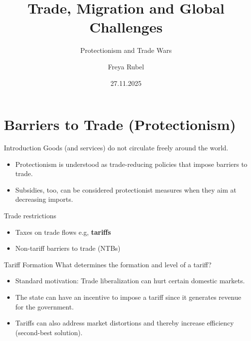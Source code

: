 \documentclass{beamer}
\author{Freya Rubel}
\title{Trade, Migration and Global Challenges}
\subtitle{Protectionism and Trade Wars}
\institute{}
\date{27.11.2025}
\begin{document}
\begin{frame}
    \titlepage
\end{frame}

\begin{frame}
    \tableofcontents[sectionstyle=show, subsectionstyle=show/shaded/hide, subsubsectionstyle=show/shaded/hide]
\end{frame}

\section{Barriers to Trade (Protectionism)}
\begin{frame}{Introduction}
    Goods (and services) do not circulate freely around the world.
    \begin{itemize} \small
        \item Protectionism is understood as trade-reducing policies that impose barriers to trade.
        \item Subsidies, too, can be considered protectionist measures when they aim at decreasing imports. %
    \end{itemize}
    Trade restrictions
    \begin{itemize} \small
        \item Taxes on trade flows e.g, \textbf{tariffs}
        \item Non-tariff barriers to trade (NTBs)
    \end{itemize}
\end{frame}

\begin{frame}{Tariff Formation}
    What determines the formation and level of a tariff?
    \begin{itemize}
        \item Standard motivation: Trade liberalization can hurt certain domestic markets. 
        \item The state can have an incentive to impose a tariff since it generates revenue for the government.
        \item Tariffs can also address market distortions and thereby increase efficiency (second-best solution).
    \end{itemize}
\end{frame}
\end{document}
